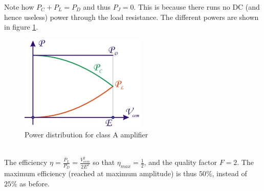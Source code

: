 Note how $P_C + P_L = P_D$ and thus $P_J = 0$. This is because there runs no DC (and hence useless) power through the load resistance. The different powers are shown in figure \ref{fig:classA3}.
\begin{figure}[h!]
	\centering
	\includegraphics[width=6cm]{figures/ch09/classA3.jpg}
	\caption{Power distribution for class A amplifier}
	\label{fig:classA3}
\end{figure}
\\The efficiency $\eta = \frac{P_L}{P_D} = \frac{V_{cem}^2}{2E^2}$ so that $\eta_{max} = \frac{1}{2}$, and the quality factor $F = 2$. The maximum efficiency (reached at maximum amplitude) is thus $50\%$, instead of $25\%$ as before.
